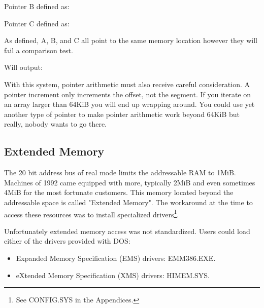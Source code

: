 \documentclass[book.tex]{subfiles}
\begin{document}
\bigskip

Pointer B defined as:\\
\par
\begin{minipage}{\textwidth}

\end{minipage}

\bigskip

Pointer C defined as:\\
\par
\begin{minipage}{\textwidth}

\end{minipage}

As defined, A, B, and C all point to the same memory location however they will fail a comparison test.\\

\begin{minipage}{\textwidth}

\end{minipage}
\par
Will output:\\

\begin{minipage}{\textwidth}

\end{minipage}
\par

With this system, pointer arithmetic must also receive careful consideration. A  pointer increment only increments the offset, not the segment. If you iterate on an array larger than 64KiB you will end up wrapping around. You could use yet another type of pointer  to make pointer arithmetic work beyond 64KiB but really, nobody wants to go there.




  \subsection{Extended Memory}

The 20 bit address bus of real mode limits the addressable RAM to 1MiB. Machines of 1992 came equipped with more, typically 2MiB and even sometimes 4MiB for the most fortunate customers. This memory located beyond the addressable space is called "Extended Memory". The workaround at the time to access these resources was to install specialized drivers\footnote{See CONFIG.SYS in the Appendices.}.\\
\par
Unfortunately extended memory access was not standardized. Users could load either of the drivers provided with DOS:
\begin{itemize}
\item Expanded Memory Specification (EMS) drivers: EMM386.EXE.
\item eXtended Memory Specification (XMS) drivers: HIMEM.SYS.
\end{itemize}
\end{document}
